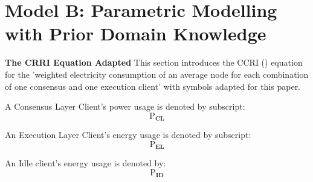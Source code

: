 \section{Model B: Parametric Modelling with Prior Domain Knowledge}



\textbf{The CRRI Equation Adapted}
This section introduces the CCRI (\cite{TheNetwork}) equation for the 'weighted  electricity  consumption  of  an  average  node for each combination of one consensus and one execution client'\cite{TheNetwork} with symbols adapted for this paper.

A Consensus Layer Client's power usage is denoted by subscript:
\begin{equation*}
    \boldsymbol{\mathrm{P}_{CL}}
\end{equation*}

An Execution Layer Client's energy usage is denoted by subscript:
\begin{equation*}
    \boldsymbol{\mathrm{P}_{EL}}
\end{equation*}
 
 An Idle client's energy usage is denoted by: \begin{equation*}
    \boldsymbol{\mathrm{P}_{ID}}
\end{equation*} 

